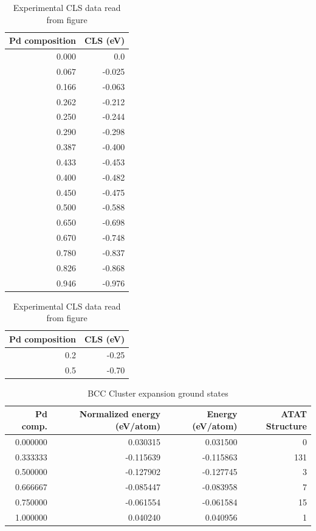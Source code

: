 \documentclass[number, sort&compress, review, 12pt]{elsarticle}
\begin{document}
\begin{table}[H]
\caption{\label{ref-15}Experimental CLS data read from figure \cite{martensson-1981-elect-cu}}
\centering
\begin{tabular}{rr}
Pd composition & CLS (eV)\\
\hline
0.000 & 0.0\\
0.067 & -0.025\\
0.166 & -0.063\\
0.262 & -0.212\\
0.250 & -0.244\\
0.290 & -0.298\\
0.387 & -0.400\\
0.433 & -0.453\\
0.400 & -0.482\\
0.450 & -0.475\\
0.500 & -0.588\\
0.650 & -0.698\\
0.670 & -0.748\\
0.780 & -0.837\\
0.826 & -0.868\\
0.946 & -0.976\\
\end{tabular}
\end{table}

\begin{table}[H]
\caption{\label{ref-5}Experimental CLS data read from figure \cite{cole-1997-deter-charg}}
\centering
\begin{tabular}{rr}
Pd composition & CLS (eV)\\
\hline
0.2 & -0.25\\
0.5 & -0.70\\
\end{tabular}
\end{table}

\begin{table}[H]
\caption{\label{bcc}BCC Cluster expansion ground states}
\centering
\begin{tabular}{rrrr}
Pd comp. & Normalized energy (eV/atom) & Energy (eV/atom) & ATAT Structure\\
\hline
0.000000 & 0.030315 & 0.031500 & 0\\
0.333333 & -0.115639 & -0.115863 & 131\\
0.500000 & -0.127902 & -0.127745 & 3\\
0.666667 & -0.085447 & -0.083958 & 7\\
0.750000 & -0.061554 & -0.061584 & 15\\
1.000000 & 0.040240 & 0.040956 & 1\\
\end{tabular}
\end{table}
\end{document}
